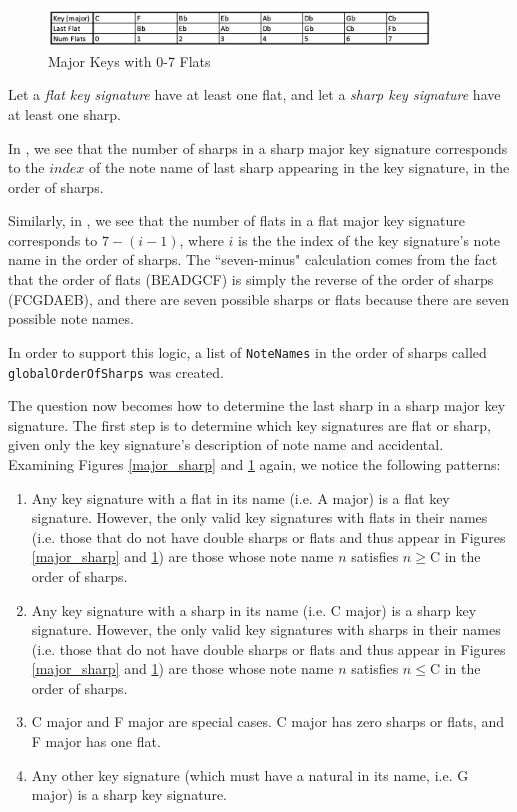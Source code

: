 \documentclass{report}
\begin{document}
\begin{figure}[h!]
\centering
\includegraphics[width=0.9\textwidth]{images/major_flat}
\caption{Major Keys with 0-7 Flats}
\label{major_flat}
\end{figure}

\newpage

Let a \textit{flat key signature} have at least one flat, and let a \textit{sharp key signature} have at least one sharp.

In , we see that the number of sharps in a sharp major key signature corresponds to the $index$ of the note name of last sharp appearing in the key signature, in the order of sharps. 

Similarly, in , we see that the number of flats in a flat major key signature corresponds to $7-(i-1)$, where $i$ is the the index of the key signature's note name in the order of sharps. The ``seven-minus" calculation comes from the fact that the order of flats (BEADGCF) is simply the reverse of the order of sharps (FCGDAEB), and there are seven possible sharps or flats because there are seven possible note names. 

In order to support this logic, a list of \verb.NoteNames. in the order of sharps called \verb.globalOrderOfSharps. was created.

The question now becomes how to determine the last sharp in a sharp major key signature. The first step is to determine which key signatures are flat or sharp, given only the key signature's description of note name and accidental. Examining Figures \ref{major_sharp} and \ref{major_flat} again, we notice the following patterns:
\begin{enumerate}
\item  Any key  signature with a flat in its name (i.e. A\musFlat \; major) is a flat key signature. However, the only valid key signatures with flats in their names (i.e. those that do not have double sharps or flats and thus appear in Figures \ref{major_sharp} and \ref{major_flat}) are those whose note name $n$ satisfies $n \geq $\;C in the order of sharps.
\item  Any key  signature with a sharp in its name (i.e. C\musSharp \; major) is a sharp key signature. However, the only valid key signatures with sharps in their names (i.e. those that do not have double sharps or flats and thus appear in Figures \ref{major_sharp} and \ref{major_flat}) are those whose note name $n$ satisfies $n \leq $\;C in the order of sharps.
\item  C major and F major are special cases. C major has zero sharps or flats, and F  major has one flat.
\item  Any other key signature (which must have a natural in its name, i.e. G major) is a sharp key signature.
\end{enumerate}
\end{document}

